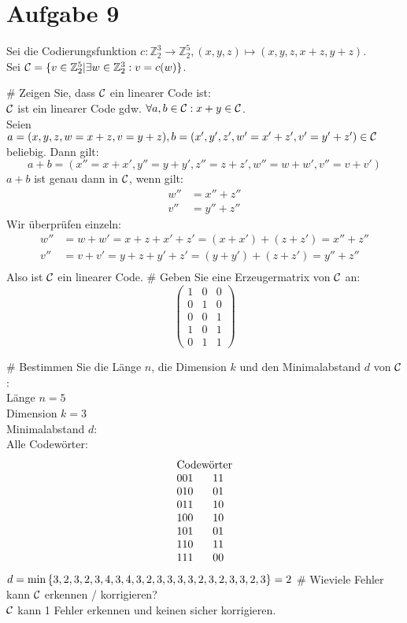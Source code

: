 \section*{Aufgabe 9}

Sei die Codierungsfunktion $c: \mathbb{Z}^3_2 \rightarrow \mathbb{Z}^5_2 , (x,y,z) \mapsto (x,y,z,x+z,y+z)$.\\
Sei $\mathcal{C} = \lbrace v \in \mathbb{Z}^5_2 | \exists w \in \mathbb{Z}^3_2: v = c(w) \rbrace$.
\begin{myList}
# Zeigen Sie, dass $\mathcal{C}$ ein linearer Code ist:\\
$\mathcal{C}$ ist ein linearer Code gdw. $\forall a, b\in\mathcal{C}: x+y\in\mathcal{C}$.\\
Seien $a = (x, y, z, w=x+z, v=y+z), b=(x', y', z', w'=x'+z', v'=y'+z')\in\mathcal{C}$ beliebig. Dann gilt:
$$a+b = (x'' = x+x', y'' = y+y', z'' = z+z', w'' = w+w', v'' = v+v')$$
$a+b$ ist genau dann in $\mathcal{C}$, wenn gilt:
\begin{align*}
w'' &= x''+z''\\
v'' &= y''+z''
\end{align*}
Wir überprüfen einzeln:
\begin{align*}
w'' &= w+w' = x+z+x'+z'=(x+x')+(z+z') = x'' + z''\\
v'' &= v+v' = y+z+y'+z'=(y+y')+(z+z') = y'' + z''\\
\end{align*}
Also ist $\mathcal{C}$ ein linearer Code.
# Geben Sie eine Erzeugermatrix von $\mathcal{C}$ an:\\
$$\begin{pmatrix}
1 & 0 & 0\\
0 & 1 & 0\\
0 & 0 & 1\\
1 & 0 & 1\\
0 & 1 & 1
\end{pmatrix}$$

#
Bestimmen Sie die Länge $n$, die Dimension $k$ und den Minimalabstand $d$ von $\mathcal{C}$:\\
Länge $n = 5$\\
Dimension $k = 3$\\
Minimalabstand $d$:\\
Alle Codewörter:
$$\begin{array}{cc}
\multicolumn{2}{c}{\text{Codewörter}}\\
001 & 11 \\
010 & 01 \\
011 & 10 \\
100 & 10 \\
101 & 01 \\
110 & 11 \\
111 & 00 \\
\end{array}$$
$d=\min\left\lbrace 3, 2, 3, 2, 3, 4, 3, 4, 3, 2, 3, 3, 3, 3, 2, 3, 2, 3, 3, 2, 3 \right\rbrace = 2$ 
# Wieviele Fehler kann $\mathcal{C}$ erkennen / korrigieren?\\
$\mathcal{C}$ kann 1 Fehler erkennen und keinen sicher korrigieren.


\end{myList}

